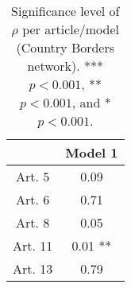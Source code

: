 \begin{table}[ht]
\centering
\begin{tabular}{cc}
  \toprule
 & Model 1 \\ 
  \midrule
Art. 5 & 0.09   \\ 
   \midrule
Art. 6 & 0.71   \\ 
   \midrule
Art. 8 & 0.05   \\ 
   \midrule
Art. 11 & 0.01 ** \\ 
   \midrule
Art. 13 & 0.79   \\ 
   \bottomrule
\end{tabular}
\caption{Significance level of $\rho$ per article/model (Country Borders network). *** $p < 0.001$, ** $p < 0.001$, and * $p < 0.001$.} 
\end{table}
